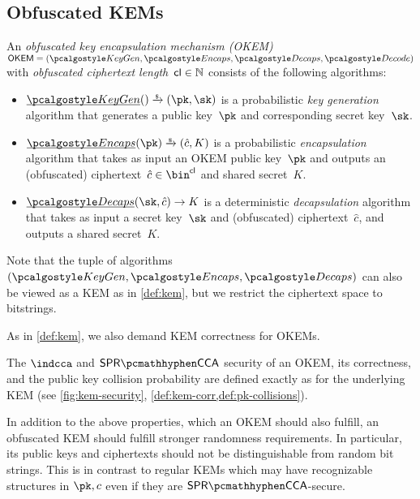 \subsection{Obfuscated KEMs}

\begin{definition}
    \label{def:okem}
    An \emph{obfuscated key encapsulation mechanism (OKEM)} $\OKEM = (\kgen, \encaps, \decaps, \decode)$ with \emph{obfuscated ciphertext length}~$\mathsf{cl} \in \mathbb{N}$ consists of the following algorithms:
    \begin{itemize}
        \item $\ul{\kgen}() \tor (\pk,\sk)$ is a probabilistic \emph{key generation} algorithm that generates a public key~$\pk$ and corresponding secret key~$\sk$.

        \item $\ul{\encaps}(\pk) \tor (\hat c, K)$ is a probabilistic \emph{encapsulation} algorithm that takes as input an OKEM public key~$\pk$ and outputs an (obfuscated) ciphertext~$\hat c \in \bin^\obfctxtlen$ and shared secret~$K$.

        \item $\ul{\decaps}(\sk,\hat c) \to K$ is a deterministic \emph{decapsulation} algorithm that takes as input a secret key~$\sk$ and (obfuscated) ciphertext~$\hat c$, and outputs a shared secret~$K$.
    \end{itemize}
    Note that the tuple of algorithms $(\kgen, \encaps, \decaps)$ can also be viewed as a KEM as in \cref{def:kem}, but we restrict the ciphertext space to bitstrings.

    As in \cref{def:kem}, we also demand KEM correctness for OKEMs.
\end{definition}

The $\indcca$ and $\sprcca$ security of an OKEM, its correctness, and the public key collision probability are defined exactly as for the underlying KEM (see \cref{fig:kem-security}, \cref{def:kem-corr,def:pk-collisions}).

In addition to the above properties, which an OKEM should also fulfill, an obfuscated KEM should fulfill stronger randomness requirements. In particular, its public keys and ciphertexts should not be distinguishable from random bit strings. This is in contrast to regular KEMs which may have recognizable structures in $\pk, c$ even if they are $\sprcca$-secure.

